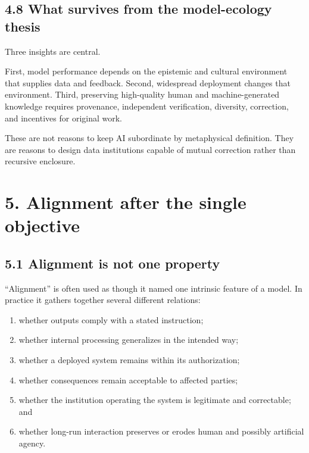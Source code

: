 \documentclass[
  11pt,
]{article}
\providecommand{\tightlist}{%
  \setlength{\itemsep}{0pt}\setlength{\parskip}{0pt}}
\begin{document}
\subsection{4.8 What survives from the model-ecology
thesis}\label{what-survives-from-the-model-ecology-thesis}

Three insights are central.

First, model performance depends on the epistemic and cultural
environment that supplies data and feedback. Second, widespread
deployment changes that environment. Third, preserving high-quality
human and machine-generated knowledge requires provenance, independent
verification, diversity, correction, and incentives for original work.

These are not reasons to keep AI subordinate by metaphysical definition.
They are reasons to design data institutions capable of mutual
correction rather than recursive enclosure.

\section{5. Alignment after the single
objective}\label{alignment-after-the-single-objective}

\subsection{5.1 Alignment is not one
property}\label{alignment-is-not-one-property}

``Alignment'' is often used as though it named one intrinsic feature of
a model. In practice it gathers together several different relations:

\begin{enumerate}
\def\labelenumi{\arabic{enumi}.}
\tightlist
\item
  whether outputs comply with a stated instruction;
\item
  whether internal processing generalizes in the intended way;
\item
  whether a deployed system remains within its authorization;
\item
  whether consequences remain acceptable to affected parties;
\item
  whether the institution operating the system is legitimate and
  correctable; and
\item
  whether long-run interaction preserves or erodes human and possibly
  artificial agency.
\end{enumerate}
\end{document}
